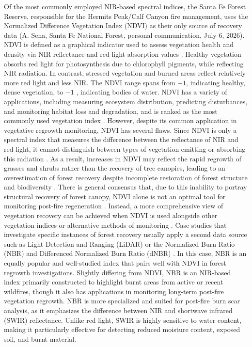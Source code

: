 \documentclass[11pt]{article}
\begin{document}
 Of the most commonly employed NIR-based spectral indices, the Santa Fe Forest Reserve, responsible for the Hermits Peak/Calf Canyon fire management, uses the Normalized Difference Vegetation Index (NDVI) as their only source of recovery data (A. Sena, Santa Fe National Forest, personal communication, July 6, 2026). NDVI is defined as a graphical indicator used to assess vegetation health and density via NIR reflectance and red light absorption values \cite{sciencedirectNDVI}. Healthy vegetation absorbs red light for photosynthesis due to chlorophyll pigments, while reflecting NIR radiation. In contrast, stressed vegetation and burned areas reflect relatively more red light and less NIR. The NDVI range spans from $+1$, indicating healthy, dense vegetation, to $-1$ \cite{mdpiNDVIrange}, indicating bodies of water. NDVI has a variety of applications, including measuring ecosystem distribution, predicting disturbances, and monitoring habitat loss and degradation, and is ranked as the most commonly used vegetation index \cite{googleBooksVI}. However, despite its common application in vegetative regrowth monitoring, NDVI has several flaws. Since NDVI is only a spectral index that measures the difference between the reflectance of NIR and red light, it cannot distinguish between types of vegetation emitting or absorbing this radiation \cite{nasaRecover}. As a result, increases in NDVI may reflect the rapid regrowth of grasses and shrubs rather than the recovery of tree canopies, leading to an overestimation of forest recovery despite incomplete restoration of forest structure and biodiversity \cite{mdpiOverestimate}. There is general consensus that, due to this inability to portray structural recovery of forest canopy, NDVI alone is not an optimal tool for monitoring post-fire regeneration \cite{nasaRecover}. Instead, a more comprehensive view of vegetation recovery can be achieved when NDVI is used alongside other vegetation indices or alternative methods of monitoring \cite{nasaRecover}. Case studies that investigate specific instances of forest recovery usually apply a second data source such as Light Detection and Ranging (LiDAR) \cite{nasaRecover} or the Normalized Burn Ratio (NBR) and Differenced Normalized Burn Ratio (dNBR) \cite{sciencedirectNBR}. In this case, NBR is an equally popular and well-studied index that pairs well with NDVI in forest regrowth investigations. Slightly differing from NDVI, NBR is an NIR-based index primarily constructed to highlight burnt areas from active or recent wildfires, though it also has applications in monitoring long-term post-fire vegetation regrowth. NBR is more specialized and suited for post-fire burn scar analysis, as it emphasizes the difference between NIR and shortwave infrared (SWIR) reflectance. Unlike red light, SWIR is highly sensitive to water content, making it particularly effective for detecting reduced moisture content, exposed soil, and burnt material.
\end{document}
